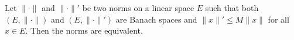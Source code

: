 Let $\|\cdot\|$ and $\|\cdot\|'$ be two norms on a linear space $E$ such that both $(E, \|\cdot\|)$ and $(E, \|\cdot\|')$ are Banach spaces and $\|x\|' \leq M\|x\|$ for all $x \in E$. Then the norms are equivalent.
